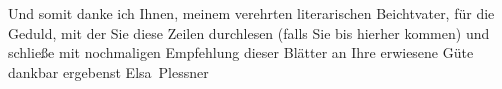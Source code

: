 \pstart
           Und somit danke ich Ihnen, meinem verehrten literarischen Beichtvater, für die
               Geduld, mit der Sie diese Zeilen durchlesen (falls Sie bis hierher kommen) und
               schließe mit nochmaligen Empfehlung dieser Blätter an Ihre erwiesene Güte dankbar ergebenst\pend
           \pstart \spacefill\mbox{Elsa Plessner}\pend{}\endnumbering{}
\begin{anhang}
\end{anhang}
      